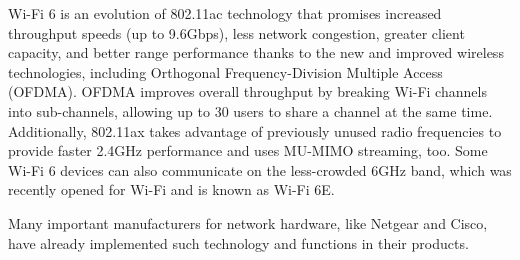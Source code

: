 				Wi-Fi 6 is an evolution of 802.11ac technology that promises increased throughput speeds (up to 9.6Gbps), less network congestion, greater client capacity, and better range performance thanks to the new and improved wireless technologies, including Orthogonal Frequency-Division Multiple Access (OFDMA). OFDMA improves overall throughput by breaking Wi-Fi channels into sub-channels, allowing up to 30 users to share a channel at the same time. Additionally, 802.11ax takes advantage of previously unused radio frequencies to provide faster 2.4GHz performance and uses MU-MIMO streaming, too. Some Wi-Fi 6 devices can also communicate on the less-crowded 6GHz band, which was recently opened for Wi-Fi and is known as Wi-Fi 6E.
				
				Many important manufacturers for network hardware, like Netgear and Cisco, have already implemented such technology and functions in their products.
						
						
%			
%
%				
%				
%				
%				
%				
%				
%				
%				
%				
%	
%	
%				
%				
%				
%				
